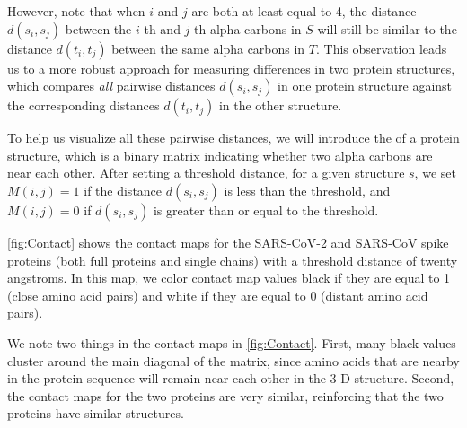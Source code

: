 {{However, note that when $i$ and $j$ are both at least equal to 4, the distance $d(s_{i}, s_{j})$ between the $i$-th and $j$-th alpha carbons in $S$ will still be similar to the distance $d(t_{i}, t_{j})$ between the same alpha carbons in $T$. This observation leads us to a more robust approach for measuring differences in two protein structures, which compares \textit{all} pairwise distances $d(s_{i}, s_{j})$ in one protein structure against the corresponding distances $d(t_{i}, t_{j})$ in the other structure.

To help us visualize all these pairwise distances, we will introduce the  of a protein structure, which is a binary matrix indicating whether two alpha carbons are near each other. After setting a threshold distance, for a given structure $s$, we set $M(i, j) = 1$ if the distance $d(s_{i}, s_{j})$ is less than the threshold, and $M(i, j) = 0$ if $d(s_{i}, s_{j})$ is greater than or equal to the threshold.

\autoref{fig:Contact} shows the contact maps for the SARS-CoV-2 and SARS-CoV spike proteins (both full proteins and single chains) with a threshold distance of twenty angstroms. In this map, we color contact map values black if they are equal to 1 (close amino acid pairs) and white if they are equal to 0 (distant amino acid pairs).

We note two things in the contact maps in \autoref{fig:Contact}. First, many black values cluster around the main diagonal of the matrix, since amino acids that are nearby in the protein sequence will remain near each other in the 3-D structure. Second, the contact maps for the two proteins are very similar, reinforcing that the two proteins have similar structures.

\begin{note}\end{note}

}}
